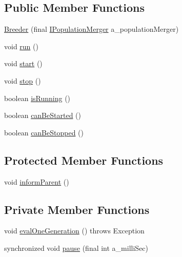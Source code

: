 \subsection*{Public Member Functions}
\begin{DoxyCompactItemize}
\item 
\hyperlink{classorg_1_1jgap_1_1distr_1_1_breeder_a2477a923e516c1586d97ff7076ade32d}{Breeder} (final \hyperlink{interfaceorg_1_1jgap_1_1distr_1_1_i_population_merger}{I\-Population\-Merger} a\-\_\-population\-Merger)
\item 
void \hyperlink{classorg_1_1jgap_1_1distr_1_1_breeder_af9b202a7dc7e8b3c2ce849ffb04e2fec}{run} ()
\item 
void \hyperlink{classorg_1_1jgap_1_1distr_1_1_breeder_a499de68ac24779970fbd14b64743fc5a}{start} ()
\item 
void \hyperlink{classorg_1_1jgap_1_1distr_1_1_breeder_ad371c6cce93099457783ac1fe6da74ca}{stop} ()
\item 
boolean \hyperlink{classorg_1_1jgap_1_1distr_1_1_breeder_ac5f4800b3c2fc9c5028d2d551319bfa6}{is\-Running} ()
\item 
boolean \hyperlink{classorg_1_1jgap_1_1distr_1_1_breeder_aa6cefdca311d1d7de887b4e2e15a6880}{can\-Be\-Started} ()
\item 
boolean \hyperlink{classorg_1_1jgap_1_1distr_1_1_breeder_ae47f796c30a1fee9d4b34c11616dc52d}{can\-Be\-Stopped} ()
\end{DoxyCompactItemize}
\subsection*{Protected Member Functions}
\begin{DoxyCompactItemize}
\item 
void \hyperlink{classorg_1_1jgap_1_1distr_1_1_breeder_ab3ff454f082f23bb5885ea8e0aa2ed89}{inform\-Parent} ()
\end{DoxyCompactItemize}
\subsection*{Private Member Functions}
\begin{DoxyCompactItemize}
\item 
void \hyperlink{classorg_1_1jgap_1_1distr_1_1_breeder_a0b61a2b972f6c6b42c9f777dc0d67abb}{eval\-One\-Generation} ()  throws Exception 
\item 
synchronized void \hyperlink{classorg_1_1jgap_1_1distr_1_1_breeder_adf23e815a3ef895842d4681b0a07595e}{pause} (final int a\-\_\-milli\-Sec)
\end{DoxyCompactItemize}
